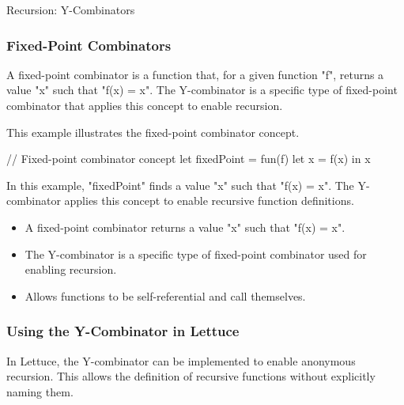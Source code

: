 \begin{notes}{Recursion: Y-Combinators}
\begin{highlight}
    \end{highlight}
    
    \subsubsection*{Fixed-Point Combinators}
    
    A fixed-point combinator is a function that, for a given function "f", returns a value "x" such that "f(x) = x". The Y-combinator is a specific type of fixed-point combinator that applies this concept to enable recursion.
    
    \begin{highlight}
    
        This example illustrates the fixed-point combinator concept.
    
    \begin{code}[Lettuce]
    // Fixed-point combinator concept
    let fixedPoint = fun(f) {
        let x = f(x) in x
    }
    \end{code}
    
        In this example, "fixedPoint" finds a value "x" such that "f(x) = x". The Y-combinator applies this concept to enable recursive function definitions.
    
        \begin{itemize}
            \item A fixed-point combinator returns a value "x" such that "f(x) = x".
            \item The Y-combinator is a specific type of fixed-point combinator used for enabling recursion.
            \item Allows functions to be self-referential and call themselves.
        \end{itemize}
    
    \end{highlight}
    
    \subsubsection*{Using the Y-Combinator in Lettuce}
    
    In Lettuce, the Y-combinator can be implemented to enable anonymous recursion. This allows the definition of recursive functions without explicitly naming them.
    
    \begin{highlight}
    

\end{highlight}
\end{notes}
